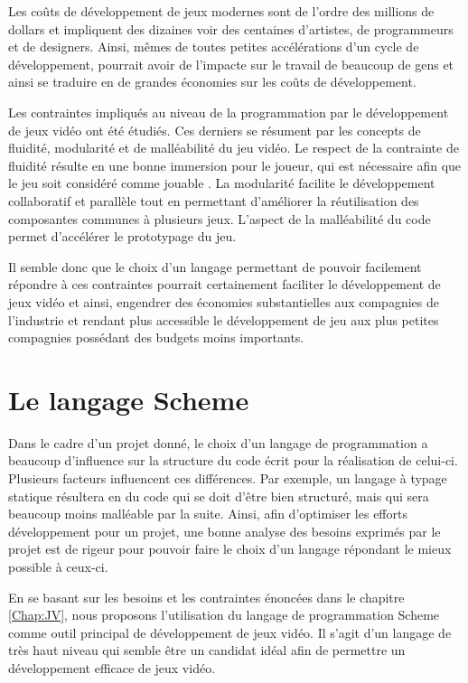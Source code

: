 \documentclass[12pt,oneside,letterpaper,francais]{book}
\begin{document}
Les coûts de développement de jeux modernes sont de l'ordre des
millions de dollars et impliquent des dizaines voir des centaines
d'artistes, de programmeurs et de designers. Ainsi, mêmes de toutes
petites accélérations d'un cycle de développement, pourrait avoir de
l'impacte sur le travail de beaucoup de gens et ainsi se traduire en
de grandes économies sur les coûts de développement.

Les contraintes impliqués au niveau de la programmation par le
développement de jeux vidéo ont été étudiés. Ces derniers se résument
par les concepts de fluidité, modularité et de malléabilité du jeu
vidéo. Le respect de la contrainte de fluidité résulte en une bonne
immersion pour le joueur, qui est nécessaire afin que le jeu soit
considéré comme \og jouable \fg. La modularité facilite le
développement collaboratif et parallèle tout en permettant d'améliorer
la réutilisation des composantes communes à plusieurs jeux. L'aspect
de la malléabilité du code permet d'accélérer le prototypage du jeu.

Il semble donc que le choix d'un langage permettant de pouvoir
facilement répondre à ces contraintes pourrait certainement faciliter
le développement de jeux vidéo et ainsi, engendrer des économies
substantielles aux compagnies de l'industrie et rendant plus
accessible le développement de jeu aux plus petites compagnies
possédant des budgets moins importants.




\chapter{Le langage Scheme}
\label{Chap:Scheme}

Dans le cadre d'un projet donné, le choix d'un langage de
programmation a beaucoup d'influence sur la structure du code écrit
pour la réalisation de celui-ci. Plusieurs facteurs influencent ces
différences. Par exemple, un langage à typage statique résultera en du
code qui se doit d'être bien structuré, mais qui sera beaucoup moins
malléable par la suite. Ainsi, afin d'optimiser les efforts
développement pour un projet, une bonne analyse des besoins exprimés
par le projet est de rigeur pour pouvoir faire le choix d'un langage
répondant le mieux possible à ceux-ci.

En se basant sur les besoins et les contraintes énoncées dans le
chapitre \ref{Chap:JV}, nous proposons l'utilisation du langage de
programmation Scheme comme outil principal de développement de jeux
vidéo. Il s'agit d'un langage de très haut niveau qui semble être un
candidat idéal afin de permettre un développement efficace de jeux
vidéo. 
\end{document}
